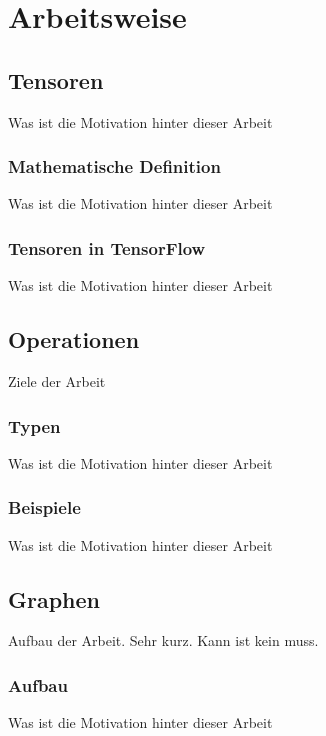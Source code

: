 \chapter{Arbeitsweise}
\label{chap:arbeitsweise}

\section{Tensoren}
\label{sec:tensoren}
Was ist die Motivation hinter dieser Arbeit

\subsection{Mathematische Definition}
\label{sec:mathematischeDefinition}
Was ist die Motivation hinter dieser Arbeit

\subsection{Tensoren in TensorFlow}
\label{sec:tensorenInTensorflow}
Was ist die Motivation hinter dieser Arbeit

\section{Operationen}
\label{sec:operationen}
Ziele der Arbeit

\subsection{Typen}
\label{sec:typen}
Was ist die Motivation hinter dieser Arbeit

\subsection{Beispiele}
\label{sec:beispiele}
Was ist die Motivation hinter dieser Arbeit

\section{Graphen}
\label{sec:graphen}
Aufbau der Arbeit. Sehr kurz. Kann ist kein muss.

\subsection{Aufbau}
\label{sec:graphenAufbau}
Was ist die Motivation hinter dieser Arbeit

